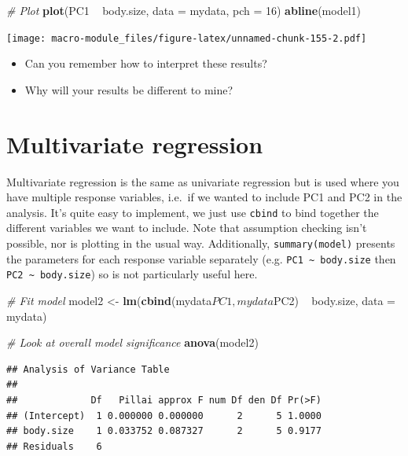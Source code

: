 \documentclass[]{book}
\newenvironment{Shaded}{\begin{snugshade}}{\end{snugshade}}
\newcommand{\KeywordTok}[1]{\textcolor[rgb]{0.13,0.29,0.53}{\textbf{{#1}}}}
\newcommand{\DataTypeTok}[1]{\textcolor[rgb]{0.13,0.29,0.53}{{#1}}}
\newcommand{\DecValTok}[1]{\textcolor[rgb]{0.00,0.00,0.81}{{#1}}}
\newcommand{\StringTok}[1]{\textcolor[rgb]{0.31,0.60,0.02}{{#1}}}
\newcommand{\CommentTok}[1]{\textcolor[rgb]{0.56,0.35,0.01}{\textit{{#1}}}}
\newcommand{\NormalTok}[1]{{#1}}
\providecommand{\tightlist}{%
  \setlength{\itemsep}{0pt}\setlength{\parskip}{0pt}}
\begin{document}
\begin{Shaded}
\begin{Highlighting}[]
\CommentTok{# Plot}
\KeywordTok{plot}\NormalTok{(PC1 ~}\StringTok{ }\NormalTok{body.size, }\DataTypeTok{data =} \NormalTok{mydata, }\DataTypeTok{pch =} \DecValTok{16}\NormalTok{)}
\KeywordTok{abline}\NormalTok{(model1)}
\end{Highlighting}
\end{Shaded}

\texttt{[image: macro-module\_files/figure-latex/unnamed-chunk-155-2.pdf]}

\begin{itemize}
\tightlist
\item
  Can you remember how to interpret these results?
\item
  Why will your results be different to mine?
\end{itemize}

\section{Multivariate regression}\label{multivariate-regression}

Multivariate regression is the same as univariate regression but is used
where you have multiple response variables, i.e.~if we wanted to include
PC1 and PC2 in the analysis. It's quite easy to implement, we just use
\texttt{cbind} to bind together the different variables we want to
include. Note that assumption checking isn't possible, nor is plotting
in the usual way. Additionally, \texttt{summary(model)} presents the
parameters for each response variable separately (e.g.
\texttt{PC1\ \textasciitilde{}\ body.size} then
\texttt{PC2\ \textasciitilde{}\ body.size}) so is not particularly
useful here.

\begin{Shaded}
\begin{Highlighting}[]
\CommentTok{# Fit model}
\NormalTok{model2 <-}\StringTok{ }\KeywordTok{lm}\NormalTok{(}\KeywordTok{cbind}\NormalTok{(mydata$PC1,mydata$PC2) ~}\StringTok{ }\NormalTok{body.size, }\DataTypeTok{data =} \NormalTok{mydata)}

\CommentTok{# Look at overall model significance}
\KeywordTok{anova}\NormalTok{(model2)}
\end{Highlighting}
\end{Shaded}

\begin{verbatim}
## Analysis of Variance Table
## 
##             Df   Pillai approx F num Df den Df Pr(>F)
## (Intercept)  1 0.000000 0.000000      2      5 1.0000
## body.size    1 0.033752 0.087327      2      5 0.9177
## Residuals    6
\end{verbatim}
\end{document}
